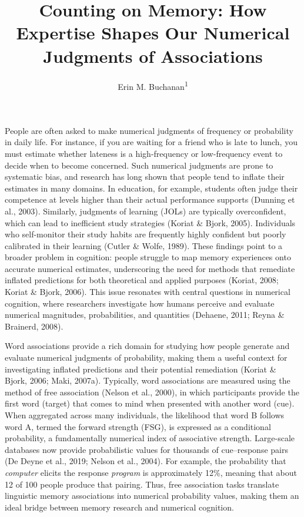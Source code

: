 \documentclass[
  man,floatsintext]{apa7}
\title{Counting on Memory: How Expertise Shapes Our Numerical Judgments of Associations}
\author{Erin M. Buchanan\textsuperscript{1}}
\date{}
\affiliation{\vspace{0.5cm}\textsuperscript{1} Harrisburg University of Science and Technology}
\begin{document}
\maketitle

People are often asked to make numerical judgments of frequency or
probability in daily life. For instance, if you are waiting for a friend
who is late to lunch, you must estimate whether lateness is a
high-frequency or low-frequency event to decide when to become
concerned. Such numerical judgments are prone to systematic bias, and
research has long shown that people tend to inflate their estimates in
many domains. In education, for example, students often judge their
competence at levels higher than their actual performance supports
(Dunning et al., 2003). Similarly, judgments of learning (JOLs) are typically
overconfident, which can lead to inefficient study strategies
(Koriat \& Bjork, 2005). Individuals who self-monitor their study habits are
frequently highly confident but poorly calibrated in their learning
(Cutler \& Wolfe, 1989). These findings point to a broader problem in cognition:
people struggle to map memory experiences onto accurate numerical
estimates, underscoring the need for methods that remediate inflated
predictions for both theoretical and applied purposes (Koriat, 2008; Koriat \& Bjork, 2006). This issue resonates with central questions in numerical
cognition, where researchers investigate how humans perceive and
evaluate numerical magnitudes, probabilities, and quantities
(Dehaene, 2011; Reyna \& Brainerd, 2008).

Word associations provide a rich domain for studying how people generate
and evaluate numerical judgments of probability, making them a useful
context for investigating inflated predictions and their potential
remediation (Koriat \& Bjork, 2006; Maki, 2007a). Typically, word associations are
measured using the method of free association (Nelson et al., 2000), in which
participants provide the first word (target) that comes to mind when
presented with another word (cue). When aggregated across many
individuals, the likelihood that word B follows word A, termed the
forward strength (FSG), is expressed as a conditional probability, a
fundamentally numerical index of associative strength. Large-scale
databases now provide probabilistic values for thousands of cue--response
pairs (De Deyne et al., 2019; Nelson et al., 2004). For example, the probability that
\emph{computer} elicits the response \emph{program} is approximately 12\%, meaning
that about 12 of 100 people produce that pairing. Thus, free association
tasks translate linguistic memory associations into numerical
probability values, making them an ideal bridge between memory research
and numerical cognition.
\end{document}
